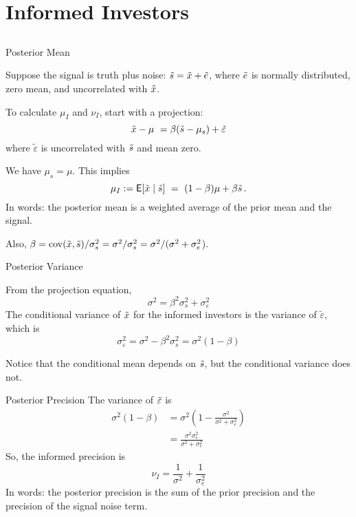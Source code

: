 \documentclass[xcolor=dvipsnames,10pt]{beamer}
\begin{document}
\section{Informed Investors}\subsection{}
\begin{frame}{Posterior Mean}

Suppose the signal is truth plus noise: $\tilde{s} = \tilde{x} + \tilde{e}$, where $\tilde{e}$ is normally distributed, zero mean, and uncorrelated with $\tilde{x}$.

To calculate $\mu_I$ and $\nu_I$, start with a projection:
$$\tilde{x} -\mu\ = \beta (\tilde{s} -\mu_s)+ \tilde \varepsilon$$
where $\tilde \varepsilon$ is uncorrelated with $\tilde{s}$ and mean zero.

We have $\mu_s = \mu$.  This implies
$$ \mu_I := \mye[\tx \mid \ts] \ = \ (1-\beta)\mu + \beta \ts\,.$$
In words: \alert{the posterior mean is a weighted average of the prior mean and the signal.}

Also, $\beta = \operatorname{cov}(\tilde{x},\tilde{s})/\sigma_s^2 = \sigma^2/\sigma_s^2 = \sigma^2/(\sigma^2+\sigma_e^2$).
\end{frame}

\begin{frame}{Posterior Variance}

From the projection equation,
$$\sigma^2 = \beta^2 \sigma_s^2 + \sigma_\varepsilon^2$$
The conditional variance of $\tilde{x}$ for the informed investors is the variance of $\tilde\varepsilon$, which is
$$\sigma_\varepsilon^2 = \sigma^2 - \beta^2\sigma_s^2 = \sigma^2(1-\beta)$$

Notice that the conditional mean depends on $\tilde{s}$, but the conditional variance does not.
\end{frame}

\begin{frame}{Posterior Precision}
The variance of $\tilde{\varepsilon}$ is
\begin{align*}
    \sigma^2(1-\beta) & = \sigma^2\left(1-\frac{\sigma^2}{\sigma^2+\sigma_e^2}\right)\\
    &= \frac{\sigma^2\sigma_e^2}{\sigma^2+\sigma_e^2}
\end{align*}
 So, the informed precision is
$$
\nu_I = \frac{1}{\sigma^2} + \frac{1}{\sigma_e^2}
$$
In words: \alert{the posterior precision is the sum of the prior precision and the precision of the signal noise term.}
\end{frame}
\end{document}

